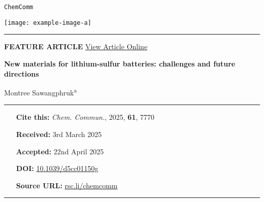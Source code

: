 \documentclass[12pt,a4paper]{article}
\begin{document}
\begin{minipage}[t]{0.48\textwidth}
    \texttt{\small ChemComm}
\end{minipage}
\hfill
\begin{minipage}[t]{0.48\textwidth}
    \raggedleft
    \texttt{[image: example-image-a]} %
\end{minipage}

\hrule
\vspace{2mm}

\noindent\textbf{\Large FEATURE ARTICLE} \hfill \href{https://rsc.li/chemcomm}{\small View Article Online}

\vspace{4mm}

{\Huge\bfseries New materials for lithium-sulfur batteries: challenges and future directions\par}
\vspace{6mm}

{\Large Montree Sawangphruk\textsuperscript{a}\par}
\vspace{8mm}

\noindent\rule{\textwidth}{0.4pt}
\begin{itemize}
    \item[\textbf{Cite this:}] \textit{Chem. Commun.}, 2025, \textbf{61}, 7770
    \item[\textbf{Received:}] 3rd March 2025
    \item[\textbf{Accepted:}] 22nd April 2025
    \item[\textbf{DOI:}] \href{https://doi.org/10.1039/d5cc01150g}{10.1039/d5cc01150g}
    \item[\textbf{Source URL:}] \href{https://rsc.li/chemcomm}{rsc.li/chemcomm}
\end{itemize}
\rule{\textwidth}{0.4pt}
\vspace{5mm}
\end{document}
